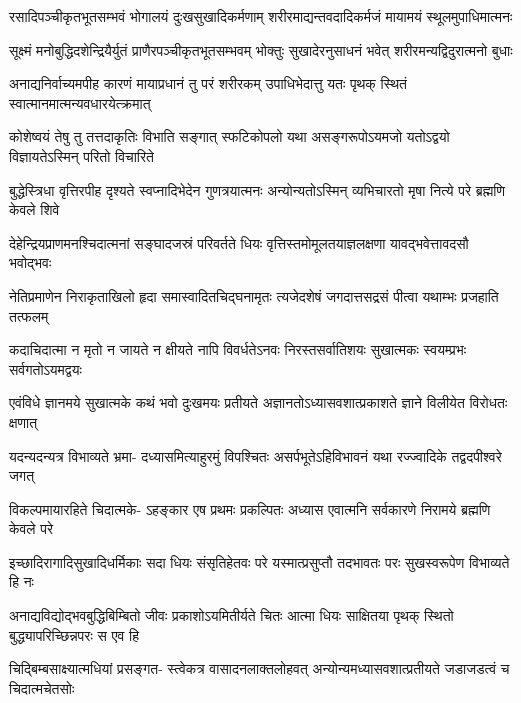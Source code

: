 \fourlineindentedshloka
{रसादिपञ्चीकृतभूतसम्भवं}
{भोगालयं दुःखसुखादिकर्मणाम्}
{शरीरमाद्यन्तवदादिकर्मजं}
{मायामयं स्थूलमुपाधिमात्मनः} %

\fourlineindentedshloka
{सूक्ष्मं मनोबुद्धिदशेन्द्रियैर्युतं}
{प्राणैरपञ्चीकृतभूतसम्भवम्}
{भोक्तुः सुखादेरनुसाधनं भवेत्}
{शरीरमन्यद्विदुरात्मनो बुधाः} %

\fourlineindentedshloka
{अनाद्यनिर्वाच्यमपीह कारणं}
{मायाप्रधानं तु परं शरीरकम्}
{उपाधिभेदात्तु यतः पृथक् स्थितं}
{स्वात्मानमात्मन्यवधारयेत्क्रमात्} %

\fourlineindentedshloka
{कोशेष्वयं तेषु तु तत्तदाकृतिः}
{विभाति सङ्गात् स्फटिकोपलो यथा}
{असङ्गरूपोऽयमजो यतोऽद्वयो}
{विज्ञायतेऽस्मिन् परितो विचारिते} %

\fourlineindentedshloka
{बुद्धेस्त्रिधा वृत्तिरपीह दृश्यते}
{स्वप्नादिभेदेन गुणत्रयात्मनः}
{अन्योन्यतोऽस्मिन् व्यभिचारतो मृषा}
{नित्ये परे ब्रह्मणि केवले शिवे} %

\fourlineindentedshloka
{देहेन्द्रियप्राणमनश्चिदात्मनां}
{सङ्घादजस्रं परिवर्तते धियः}
{वृत्तिस्तमोमूलतयाज्ञलक्षणा}
{यावद्भवेत्तावदसौ भवोद्भवः} %

\fourlineindentedshloka
{नेतिप्रमाणेन निराकृताखिलो}
{हृदा समास्वादितचिद्घनामृतः}
{त्यजेदशेषं जगदात्तसद्रसं}
{पीत्वा यथाम्भः प्रजहाति तत्फलम्} %

\fourlineindentedshloka
{कदाचिदात्मा न मृतो न जायते}
{न क्षीयते नापि विवर्धतेऽनवः}
{निरस्तसर्वातिशयः सुखात्मकः}
{स्वयम्प्रभः सर्वगतोऽयमद्वयः} %

\fourlineindentedshloka
{एवंविधे ज्ञानमये सुखात्मके}
{कथं भवो दुःखमयः प्रतीयते}
{अज्ञानतोऽध्यासवशात्प्रकाशते}
{ज्ञाने विलीयेत विरोधतः क्षणात्} %

\fourlineindentedshloka
{यदन्यदन्यत्र विभाव्यते भ्रमा-}
{दध्यासमित्याहुरमुं विपश्चितः}
{असर्पभूतेऽहिविभावनं यथा}
{रज्ज्वादिके तद्वदपीश्वरे जगत्} %

\fourlineindentedshloka
{विकल्पमायारहिते चिदात्मके-}
{ऽहङ्कार एष प्रथमः प्रकल्पितः}
{अध्यास एवात्मनि सर्वकारणे}
{निरामये ब्रह्मणि केवले परे} %

\fourlineindentedshloka
{इच्छादिरागादिसुखादिधर्मिकाः}
{सदा धियः संसृतिहेतवः परे}
{यस्मात्प्रसुप्तौ तदभावतः परः}
{सुखस्वरूपेण विभाव्यते हि नः} %

\fourlineindentedshloka
{अनाद्यविद्योद्भवबुद्धिबिम्बितो}
{जीवः प्रकाशोऽयमितीर्यते चितः}
{आत्मा धियः साक्षितया पृथक् स्थितो}
{बुद्ध्यापरिच्छिन्नपरः स एव हि} %

\fourlineindentedshloka
{चिद्बिम्बसाक्ष्यात्मधियां प्रसङ्गत-}
{स्त्वेकत्र वासादनलाक्तलोहवत्}
{अन्योन्यमध्यासवशात्प्रतीयते}
{जडाजडत्वं च चिदात्मचेतसोः} %

